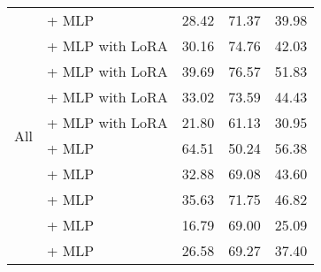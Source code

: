 \begin{longtable}{p{4cm}p{6cm}ccc}
    \multirow{10}{*}{All}                 & \citep{radford2019language} + MLP                                      & 28.42                                & 71.37              & 39.98             \\
                                          & \citep{llama3.2-1b-instruct} + MLP with LoRA                           & 30.16                                & 74.76              & 42.03             \\
                                          & \citep{abdin2024phi3technicalreporthighly} + MLP with LoRA             & 39.69                                & 76.57              & 51.83             \\
                                          & \citep{qwen2.5} + MLP with LoRA                                        & 33.02                                & 73.59              & 44.43             \\
                                          & \citep{gemma_2024} + MLP with LoRA                                     & 21.80                                & 61.13              & 30.95             \\
                                          & \citep{DBLP:journals/corr/abs-1911-02116} + MLP                        & 64.51                                & 50.24              & 56.38             \\
                                          & \citep{DBLP:journals/corr/abs-1910-13461} + MLP                        & 32.88                                & 69.08              & 43.60             \\
                                          & \citep{DBLP:journals/corr/abs-1810-04805} + MLP                        & 35.63                                & 71.75              & 46.82             \\
                                          & \citep{dai2020funneltransformer} + MLP                                 & 16.79                                & 69.00              & 25.09             \\
                                          & \citep{clark2020electra} + MLP                                         & 26.58                                & 69.27              & 37.40             \\
    \midrule


\end{longtable}
